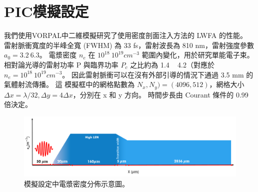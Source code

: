 \section{PIC模擬設定}
我們使用VORPAL中二維模擬研究了使用密度剖面注入方法的 LWFA 的性能。 雷射脈衝寬度的半峰全寬 (FWHM) 為 33 fs，雷射波長為 810 nm，雷射強度參數 \(a_0 = 3.2 ~ 6.3\)。 電漿密度 \(n_e\) 在 \(10^{18}~10^{19} cm^{-3}\) 範圍內變化，用於研究單能電子束。 相對論光導的雷射功率 P 與臨界功率 \(P_c\) 之比約為 1.4 ~ 4.2（對應於 \(n_e = 10^{18}~10^{19} cm^{-3}\)。 因此雷射脈衝可以在沒有外部引導的情況下通過 3.5 mm 的氣體射流傳播。 這
模擬框中的網格點數為 \(N_x, N_y) = (4096, 512)\)，網格大小 \(\Delta x =\lambda/32 , \Delta y = 4 \Delta x\)，分別在 x 和 y 方向。 時間步長由 Courant 條件的 0.99 倍決定。
\begin{figure}
  \centering
  \includegraphics[scale = 0.5]{figures/density profile.png}
  \caption{模擬設定中電漿密度分佈示意圖。}
  \label{fig:plasma_density_profile}
\end{figure}
